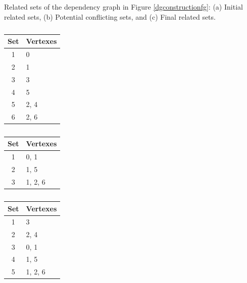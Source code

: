 {\begin{table}[tb]
\scriptsize
    \caption{Related sets of the dependency graph in Figure \ref{dgconstructionfg}: (a) Initial related sets, (b) Potential conflicting sets, and (c) Final related sets.}
    \centering
    \begin{subtable}[t]{.32\linewidth}
      \centering
        \caption{}
        \label{dependentset}
	{
        \begin{tabular}{| c | l |}
	\hline
	\bf Set & \bf Vertexes\\
	\hline
	1 & 0\\
	\hline
	2 & 1\\
	\hline
	3 & 3\\
	\hline
	4 & 5\\
	\hline
	5 & 2, 4\\
	\hline
	6 & 2, 6\\
	\hline
	\end{tabular}
	}
    \end{subtable}%
    \begin{subtable}[t]{.32\linewidth}
      \centering
        \caption{}
        \label{dependentsetconflict}
	{
        \begin{tabular}{| c | l |}
	\hline
	\bf Set & \bf Vertexes\\
	\hline
	1 & 0, 1\\
	\hline
	2 & 1, 5\\
	\hline
	3 & 1, 2, 6\\
	\hline
	\end{tabular}
	}
    \end{subtable}
    \begin{subtable}[t]{.32\linewidth}
    \centering
        \caption{}
        \label{finaldependentset}
	{
    	\begin{tabular}{| c | l |}
	\hline
	\bf Set & \bf Vertexes\\
	\hline
	1 & 3\\
	\hline
	2 & 2, 4\\
	\hline
	3 & 0, 1\\
	\hline
	4 & 1, 5\\
	\hline
	5 & 1, 2, 6\\
	\hline
	\end{tabular}
	}
    \end{subtable}
\end{table}

}
